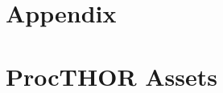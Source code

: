 {
\section*{Appendix}

\startcontents[sections]
}





\newpage


% 



\newpage

\section{ProcTHOR Assets}
\label{sec:procthorObjects}

\vspace{-0.15in}

